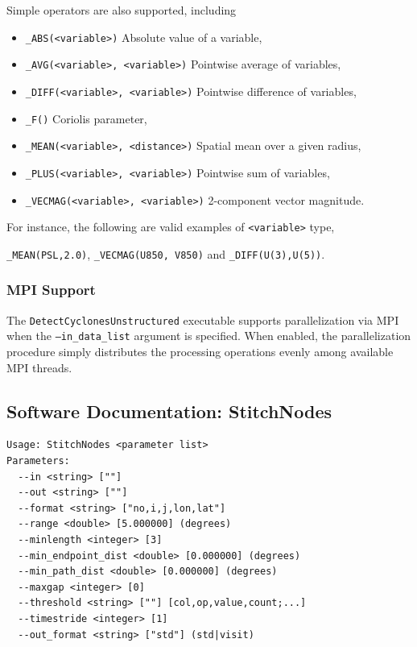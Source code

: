 \documentclass[gmdd, hvmath, online]{copernicus_discussions}
\begin{document}
Simple operators are also supported, including
\begin{itemize}
\item[] \texttt{\_ABS(<variable>)} Absolute value of a variable,
\item[] \texttt{\_AVG(<variable>, <variable>)} Pointwise average of variables,
\item[] \texttt{\_DIFF(<variable>, <variable>)} Pointwise difference of variables,
\item[] \texttt{\_F()}  Coriolis parameter,
\item[] \texttt{\_MEAN(<variable>, <distance>)} Spatial mean over a given radius,
\item[] \texttt{\_PLUS(<variable>, <variable>)} Pointwise sum of variables,
\item[] \texttt{\_VECMAG(<variable>, <variable>)} 2-component vector magnitude.
\end{itemize}  For instance, the following are valid examples of \texttt{<variable>} type,
\begin{center}
\texttt{\_MEAN(PSL,2.0)}, \quad \texttt{\_VECMAG(U850, V850)} \quad and \quad \texttt{\_DIFF(U(3),U(5))}.
\end{center}

\subsubsection{MPI Support} \label{sec:VariableSpecification}

The \texttt{DetectCyclonesUnstructured} executable supports parallelization via MPI when the \texttt{--in\_data\_list} argument is specified.  When enabled, the parallelization procedure simply distributes the processing operations evenly among available MPI threads.

\subsection{Software Documentation: StitchNodes} \label{sec:StitchNodesAppendix}

\begin{verbatim}
Usage: StitchNodes <parameter list>
Parameters:
  --in <string> [""] 
  --out <string> [""] 
  --format <string> ["no,i,j,lon,lat"] 
  --range <double> [5.000000] (degrees)
  --minlength <integer> [3] 
  --min_endpoint_dist <double> [0.000000] (degrees)
  --min_path_dist <double> [0.000000] (degrees)
  --maxgap <integer> [0] 
  --threshold <string> [""] [col,op,value,count;...]
  --timestride <integer> [1] 
  --out_format <string> ["std"] (std|visit)
\end{verbatim}
\end{document}
